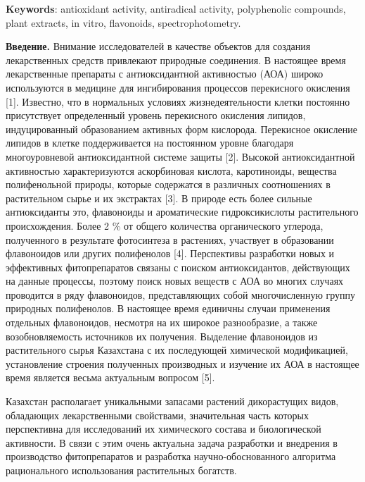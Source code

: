 {\bfseries Keywords}: antioxidant activity, antiradical activity,
polyphenolic compounds, plant extracts, in vitro, flavonoids,
spectrophotometry.

\begin{multicols}{2}
{\bfseries Введение.} Внимание исследователей в качестве объектов для
создания лекарственных средств привлекают природные соединения. В
настоящее время лекарственные препараты с антиоксидантной активностью
(АОА) широко используются в медицине для ингибирования процессов
перекисного окисления {[}1{]}. Известно, что в нормальных условиях
жизнедеятельности клетки постоянно присутствует определенный уровень
перекисного окисления липидов, индуцированный образованием активных форм
кислорода. Перекисное окисление липидов в клетке поддерживается на
постоянном уровне благодаря многоуровневой антиоксидантной системе
защиты {[}2{]}. Высокой антиоксидантной активностью характеризуются
аскорбиновая кислота, каротиноиды, вещества полифенольной природы,
которые содержатся в различных соотношениях в растительном сырье и их
экстрактах {[}3{]}. В природе есть более сильные антиоксиданты это,
флавоноиды и ароматические гидроксикислоты растительного происхождения.
Более 2 \% от общего количества органического углерода, полученного в
результате фотосинтеза в растениях, участвует в образовании флавоноидов
или других полифенолов {[}4{]}. Перспективы разработки новых и
эффективных фитопрепаратов связаны с поиском антиоксидантов, действующих
на данные процессы, поэтому поиск новых веществ с АОА во многих случаях
проводится в ряду флавоноидов, представляющих собой многочисленную
группу природных полифенолов. В настоящее время единичны случаи
применения отдельных флавоноидов, несмотря на их широкое разнообразие, а
также возобновляемость источников их получения. Выделение флавоноидов из
растительного сырья Казахстана с их последующей химической модификацией,
установление строения полученных производных и изучение их АОА в
настоящее время является весьма актуальным вопросом {[}5{]}.

Казахстан располагает уникальными запасами растений дикорастущих видов,
обладающих лекарственными свойствами, значительная часть которых
перспективна для исследований их химического состава и биологической
активности. В связи с этим очень актуальна задача разработки и внедрения
в производство фитопрепаратов и разработка научно-обоснованного
алгоритма рационального использования растительных богатств.


\end{multicols}
